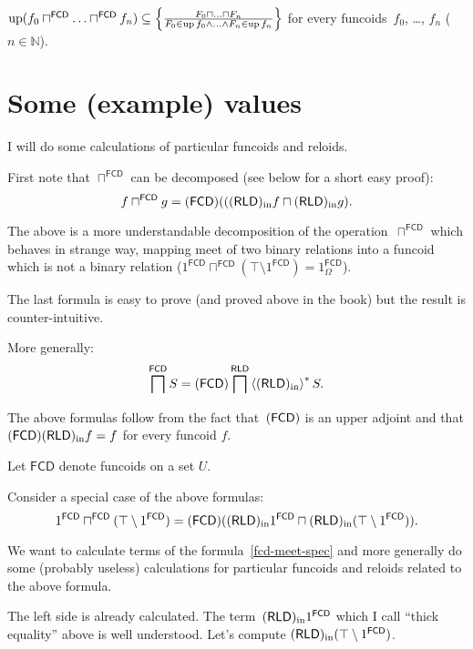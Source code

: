 \begin{xca}
$\operatorname{up} (f_0 \sqcap^{\mathsf{FCD}} \ldots
\sqcap^{\mathsf{FCD}} f_n) \subseteq \left\{ \frac{ F_0 \sqcap \ldots \sqcap
F_n }{ F_0 \in \operatorname{up} f_0 \wedge \ldots \wedge F_n \in \operatorname{up} f_n }\right\}$ for every funcoids~$f_0$, \dots, $f_n$ ($n\in\mathbb{N}$).
\end{xca}


\section{Some (example) values}

I will do some calculations of particular funcoids and reloids.

First note that $\sqcap^{\mathsf{FCD}}$ can be decomposed (see below for a short easy proof):
\[ f \sqcap^{\mathsf{FCD}} g = (\mathsf{FCD}) (((\mathsf{RLD})_{\mathrm{in}} f \sqcap (\mathsf{RLD})_{\mathrm{in}} g). \]

The above is a more understandable decomposition of the operation~$\sqcap^{\mathsf{FCD}}$
which behaves in strange way, mapping meet of two binary relations into a funcoid which
is not a binary relation ($1^{\mathsf{FCD}} \sqcap^{\mathsf{FCD}} (\top \setminus 1^{\mathsf{FCD}}) =
1^{\mathsf{FCD}}_{\Omega}$).

The last formula is easy to prove (and proved above in the book) but the result is counter-intuitive.

More generally:
\[ \bigsqcap^{\mathsf{FCD}} S = (\mathsf{FCD}) \bigsqcap^{\mathsf{RLD}} \left\langle (\mathsf{RLD})_{\mathrm{in}}\right\rangle ^{\ast} S. \]

The above formulas follow from the fact that~$(\mathsf{FCD})$ is an upper adjoint
and that $(\mathsf{FCD})(\mathsf{RLD})_{\mathrm{in}} f=f$ for every funcoid $f$.

Let $\mathsf{FCD}$ denote funcoids on a set $U$.

Consider a special case of the above formulas:
\begin{equation}\label{fcd-meet-spec}
1^{\mathsf{FCD}} \sqcap^{\mathsf{FCD}} (\top \setminus 1^{\mathsf{FCD}}) =
(\mathsf{FCD}) ((\mathsf{RLD})_{\mathrm{in}} 1^{\mathsf{FCD}} \sqcap (\mathsf{RLD})_{\mathrm{in}} (\top \setminus 1^{\mathsf{FCD}})).
\end{equation}

We want to calculate terms of the formula~\eqref{fcd-meet-spec} and more generally do some
(probably useless) calculations for particular funcoids and reloids related to the above formula.

The left side is already calculated. The term~$(\mathsf{RLD})_{\mathrm{in}} 1^{\mathsf{FCD}}$ which I call
``thick equality'' above is well understood. Let's compute $(\mathsf{RLD})_{\mathrm{in}} (\top \setminus 1^{\mathsf{FCD}})$.

